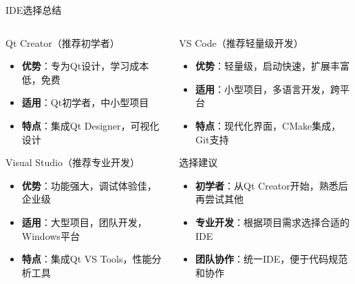 \documentclass[UTF8,aspectratio=169]{beamer}
\begin{document}
\begin{frame}{IDE选择总结}
    \begin{columns}
        \begin{column}{0.48\textwidth}
            \begin{ytublock}{Qt Creator（推荐初学者）}
                \begin{itemize}
                    \item \textbf{优势}：专为Qt设计，学习成本低，免费
                    \item \textbf{适用}：Qt初学者，中小型项目
                    \item \textbf{特点}：集成Qt Designer，可视化设计
                \end{itemize}
            \end{ytublock}
            \begin{ytublock}{Visual Studio（推荐专业开发）}
                \begin{itemize}
                    \item \textbf{优势}：功能强大，调试体验佳，企业级
                    \item \textbf{适用}：大型项目，团队开发，Windows平台
                    \item \textbf{特点}：集成Qt VS Tools，性能分析工具
                \end{itemize}
            \end{ytublock}
        \end{column}
        \hspace{0.02\textwidth}
        \begin{column}{0.48\textwidth}
            \begin{ytublock}{VS Code（推荐轻量级开发）}
                \begin{itemize}
                    \item \textbf{优势}：轻量级，启动快速，扩展丰富
                    \item \textbf{适用}：小型项目，多语言开发，跨平台
                    \item \textbf{特点}：现代化界面，CMake集成，Git支持
                \end{itemize}
            \end{ytublock}
            \begin{ytublock}{选择建议}
                \begin{itemize}
                    \item \textbf{初学者}：从Qt Creator开始，熟悉后再尝试其他
                    \item \textbf{专业开发}：根据项目需求选择合适的IDE
                    \item \textbf{团队协作}：统一IDE，便于代码规范和协作
                \end{itemize}
            \end{ytublock}
        \end{column}
    \end{columns}
\end{frame}
\end{document}
